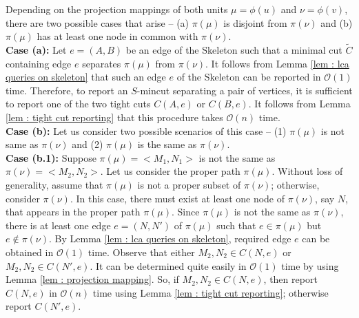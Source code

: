 \documentclass[letterpaper,11pt]{article}
\begin{document}
 Depending on the projection mappings of both units $\mu=\phi(u)$ and $\nu=\phi(v)$, there are two possible cases that arise -- (a) $\pi(\mu)$ is disjoint from $\pi(\nu)$ and (b) $\pi(\mu)$ has at least one node in common with $\pi(\nu)$. \\

\noindent 
\textbf{Case (a):} Let $e=(A,B)$ be an edge of the Skeleton such that a minimal cut $\tilde C$ containing edge $e$ separates $\pi(\mu)$ from $\pi(\nu)$. It follows from Lemma \ref{lem : lca queries on skeleton} that such an edge $e$ of the Skeleton can be reported in ${\mathcal O}(1)$ time. Therefore, to report an $S$-mincut separating a pair of vertices, it is sufficient to report one of the two tight cuts $C(A,e)$ or $C(B,e)$. It follows from Lemma \ref{lem : tight cut reporting} that this procedure takes ${\mathcal O}(n)$ time. \\

\noindent
\textbf{Case (b):} Let us consider two possible scenarios of this case -- (1) $\pi(\mu)$ is not same as $\pi(\nu)$ and (2) $\pi(\mu)$ is the same as $\pi(\nu)$.\\

\noindent
\textbf{Case (b.1):} Suppose $\pi(\mu)=<M_1,N_1>$ is not the same as $\pi(\nu)=<M_2,N_2>$. Let us consider the proper path $\pi(\mu)$. Without loss of generality, assume that $\pi(\mu)$ is not a proper subset of $\pi(\nu)$; otherwise, consider $\pi(\nu)$. In this case, there must exist at least one node of $\pi(\nu)$, say $N$, that appears in the proper path $\pi(\mu)$. Since $\pi(\mu)$ is not the same as $\pi(\nu)$, there is at least one edge $e=(N,N')$ of $\pi(\mu)$ such that $e\in \pi(\mu)$ but $e\notin \pi(\nu)$. By Lemma \ref{lem : lca queries on skeleton}, required edge $e$ can be obtained in ${\mathcal O}(1)$ time. Observe that either $M_2,N_2\in C(N,e)$ or $M_2,N_2\in C(N',e)$. It can be determined quite easily in ${\mathcal O}(1)$ time by using Lemma \ref{lem : projection mapping}.
So, if $M_2,N_2\in C(N,e)$, then report $C(N,e)$ in ${\mathcal O}(n)$ time using Lemma \ref{lem : tight cut reporting}; otherwise report $C(N',e)$.\\
\end{document}

